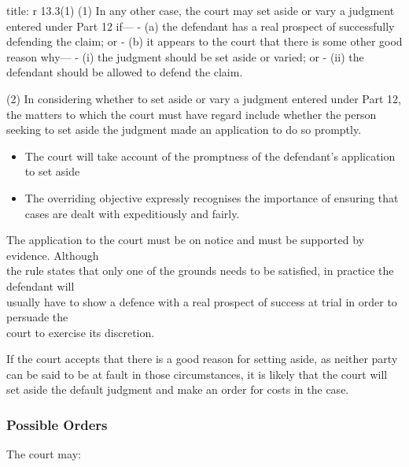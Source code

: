 \documentclass[
]{article}
\newenvironment{Shaded}{}{}
\newcommand{\NormalTok}[1]{#1}
\providecommand{\tightlist}{%
  \setlength{\itemsep}{0pt}\setlength{\parskip}{0pt}}
\begin{document}
\begin{Shaded}
\begin{Highlighting}[]
\NormalTok{title: r 13.3(1)}
\NormalTok{(1) In any other case, the court may set aside or vary a judgment entered under Part 12 if—}
\NormalTok{{-} (a) the defendant has a real prospect of successfully defending the claim; or}
\NormalTok{{-} (b) it appears to the court that there is some other good reason why—}
\NormalTok{    {-} (i) the judgment should be set aside or varied; or}
\NormalTok{    {-} (ii) the defendant should be allowed to defend the claim.}

\NormalTok{(2) In considering whether to set aside or vary a judgment entered under Part 12, the matters to which the court must have regard include whether the person seeking to set aside the judgment made an application to do so promptly.}
\end{Highlighting}
\end{Shaded}

\begin{itemize}
\tightlist
\item
  The court will take account of the promptness of the defendant's
  application to set aside
\item
  The overriding objective expressly recognises the importance of
  ensuring that cases are dealt with expeditiously and fairly.
\end{itemize}

The application to the court must be on notice and must be supported by
evidence. Although\\
the rule states that only one of the grounds needs to be satisfied, in
practice the defendant will\\
usually have to show a defence with a real prospect of success at trial
in order to persuade the\\
court to exercise its discretion.

If the court accepts that there is a good reason for setting aside, as
neither party can be said to be at fault in those circumstances, it is
likely that the court will set aside the default judgment and make an
order for costs in the case.

\hypertarget{possible-orders-1}{%
\subsubsection{Possible Orders}\label{possible-orders-1}}

The court may:
\end{document}
